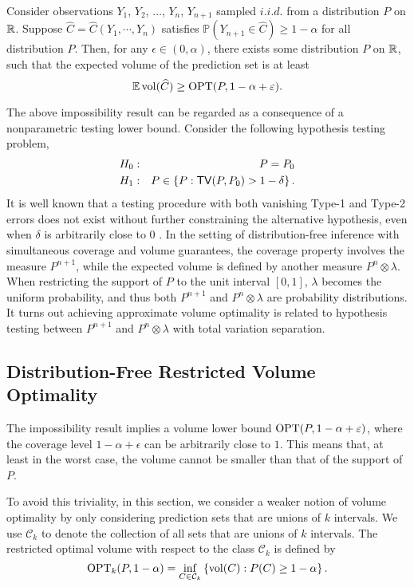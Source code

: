 \begin{theorem}\label{thm:impossibility}
Consider observations $Y_1$, $Y_2$, $\dots$, $Y_n$, $Y_{n+1}$ sampled $i.i.d.$ from a distribution $P$ on $\mathbb{R}$. 
Suppose $\widehat{C}=\widehat{C}(Y_1,\cdots,Y_n)$ satisfies $\mathbb{P}(Y_{n+1}\in \widehat{C})\geq 1-\alpha$
for all distribution $P$. 
Then, for any $\epsilon \in (0,\alpha)$, there exists some distribution $P$ on $\mathbb{R}$, such that the expected volume of the prediction set is at least
$$\operatorname*{\mathbb{E}}\mathrm{vol}(\widehat{C})\geq \operatorname{OPT}(P,1-\alpha+\varepsilon).$$
\end{theorem}

The above impossibility result can be regarded as a consequence of a nonparametric testing lower bound. Consider the following hypothesis testing problem,
\begin{eqnarray*}
H_0:&& P=P_0 \\
H_1:&& P\in\left\{P:{\sf TV}(P,P_0)>1-\delta\right\}.
\end{eqnarray*}
It is well known that a testing procedure with both vanishing Type-1 and Type-2 errors does not exist without further constraining the alternative hypothesis, even when $\delta$ is arbitrarily close to $0$ \citep{lecam1960necessary,barron1989uniformly}. In the setting of distribution-free inference with simultaneous coverage and volume guarantees, the coverage property involves the measure $P^{n+1}$, while the expected volume is defined by another measure $P^n\otimes\lambda$. When restricting the support of $P$ to the unit interval $[0,1]$, $\lambda$ becomes the uniform probability, and thus both $P^{n+1}$ and $P^n\otimes\lambda$ are probability distributions. It turns out achieving approximate volume optimality is related to hypothesis testing between $P^{n+1}$ and $P^n\otimes\lambda$ with total variation separation.






\subsection{Distribution-Free Restricted Volume Optimality}

The impossibility result implies a volume lower bound $\operatorname{OPT}(P,1-\alpha+\varepsilon)$, where the coverage level $1-\alpha+\epsilon$ can be arbitrarily close to $1$. This means that, at least in the worst case, the volume cannot be smaller than that of the support of $P$.

To avoid this triviality, in this section, we consider a weaker notion of volume optimality by only considering prediction sets that are unions of $k$ intervals. We use $\mathcal{C}_k$ to denote the collection of all sets that are unions of $k$ intervals. The restricted optimal volume with respect to the class $\mathcal{C}_k$ is defined by
\begin{equation}
\operatorname{OPT}_k(P, 1-\alpha) = \inf_{C \in \mathcal{C}_k} \left\{\mathrm{vol}(C) : P(C) \geq 1-\alpha \right\}. \label{eq:res-opt}
\end{equation}

